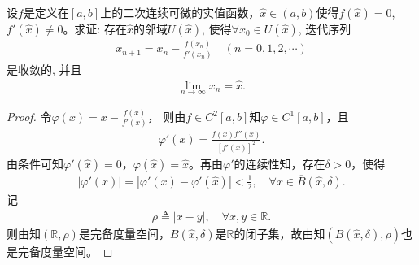 \documentclass[../../main.tex]{subfiles}%
\begin{document}
\begin{example}[Newton法]

设$f$是定义在$[a,b]$上的二次连续可微的实值函数，$\widehat{x} \in (a,b)$使得$f(\widehat{x})=0$, $f'(\widehat{x}) \neq 0$。求证: 存在$\widehat{x}$的邻域$U(\widehat{x})$, 使得$\forall x_0 \in U(\widehat{x})$, 迭代序列
\begin{align*}
x_{n+1} = x_n - \frac{f(x_n)}{f'(x_n)} \quad (n=0,1,2,\cdots)
\end{align*}
是收敛的, 并且
\begin{align*}
\lim\limits_{n\to\infty} x_n = \widehat{x}.
\end{align*}
\end{example}
\begin{proof}
令$\varphi(x)=x-\frac{f(x)}{f'(x)}$，
则由$f\in C^2[a,b]$知$\varphi\in C^1[a,b]$，且
\begin{align*}
\varphi'(x)=\frac{f(x)f''(x)}{[f'(x)]^2}.
\end{align*}
由条件可知$\varphi'(\widehat{x})=0$，$\varphi(\widehat{x})=\widehat{x}$。再由$\varphi'$的连续性知，存在$\delta>0$，使得
\begin{align*}
|\varphi'(x)|=|\varphi'(x)-\varphi'(\widehat{x})|<\frac{1}{2},\quad \forall x\in \overline{B}(\widehat{x},\delta).
\end{align*}
记
\begin{align*}
\rho\triangleq |x-y|,\quad \forall x,y\in\mathbb{R}.
\end{align*}
则由知$(\mathbb{R},\rho)$是完备度量空间，$\overline{B}(\widehat{x},\delta)$是$\mathbb{R}$的闭子集，故由知$(\overline{B}(\widehat{x},\delta),\rho)$也是完备度量空间。


\end{proof}
\end{document}
